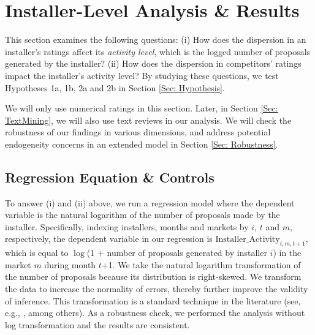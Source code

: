 \documentclass[msom,blindrev]{informs3}
\begin{document}
	
	
	
	
	
	\section{Installer-Level Analysis \& Results} \label{Sec: Installer-level}
	
	This section examines the following questions: (i) How does the dispersion in an installer's ratings affect its \emph{activity level}, which is the logged  number of proposals generated by the installer? (ii) How does the dispersion in competitors' ratings impact the installer's activity level? By studying these questions, we test Hypotheses 1a, 1b, 2a and 2b in Section \ref{Sec: Hypothesis}.
	
	
	We will only use numerical ratings in this section. Later, in Section \ref{Sec: TextMining}, we will also use text reviews in our analysis. We will check the robustness of our findings in various dimensions, and address potential endogeneity concerns in an extended model in Section \ref{Sec: Robustness}.
	
	\subsection{Regression Equation \& Controls}
	
	To answer (i) and (ii) above, we run a regression model where the dependent variable is the natural logarithm of the number of proposals made by the installer. Specifically, indexing installers, months and markets by $i$, $t$ and $m$, respectively, the dependent variable in our regression is  $\text{Installer\_Activity}_{i,m,t+1}$, which is equal to $\log$(1 $+$ number of proposals generated by installer $i$) in the market $m$ during month $t$+1. We take the natural logarithm transformation of the number of proposals because its distribution is right-skewed.  We transform the data to increase the normality of errors, thereby further improve the validity of inference. This transformation is a standard technique in the literature (see, e.g., \citet{song2017closing,tan2014does}, among others). As a robustness check, we performed the analysis without log transformation and the results are consistent.
	
\end{document}
